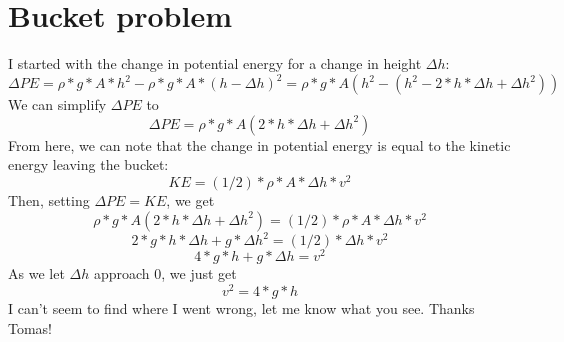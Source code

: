 \documentclass{article}
\begin{document}
\section*{Bucket problem}

I started with the change in potential energy for a change in height $\Delta h$:
$$ \Delta PE = \rho * g * A * h^2 - \rho * g * A * (h - \Delta h)^2 = \rho * g * A (h^2 - (h^2 - 2 * h * \Delta h + \Delta h^2))$$
We can simplify $\Delta PE$ to
$$ \Delta PE = \rho * g * A (2* h* \Delta h + \Delta h^2) $$
From here, we can note that the change in potential energy is equal to the kinetic energy leaving the bucket:
$$ KE = (1/2) * \rho * A * \Delta h * v^2 $$
Then, setting $\Delta PE = KE$, we get
$$ \rho * g * A (2* h* \Delta h + \Delta h^2) = (1/2) * \rho * A * \Delta h * v^2 $$
$$ 2 * g * h* \Delta h + g * \Delta h^2 = (1/2)*\Delta h * v^2 $$
$$ 4 * g * h + g * \Delta h = v^2 $$
As we let $\Delta h$ approach 0, we just get
$$ v^2 = 4*g*h $$
I can't seem to find where I went wrong, let me know what you see.
Thanks Tomas!
\end{document}
